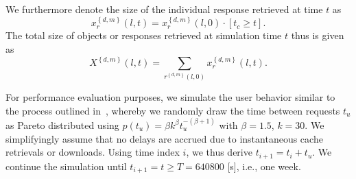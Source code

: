 \documentclass[letterpaper,conference]{IEEEtran}
\begin{document}
We furthermore denote the size of the individual response retrieved at time $t$ as 
\begin{equation}
x_{r}^{\left\{ d,m \right\}}(l,t) = x_{r}^{\left\{ d,m \right\}}(l,0) \cdot \left[ t_c \ge t \right].
\end{equation}
The total size of objects or responses retrieved at simulation time $t$ thus is given as 
\begin{equation}
X^{\left\{ d,m \right\}}(l,t) =\sum_{r^{\left\{ d,m \right\}}(l,0)} x_{r}^{\left\{ d,m \right\}}(l,t).
\end{equation}


For performance evaluation purposes, we simulate the user behavior similar to the process outlined in~\cite{AnCoGrPa03}, whereby we randomly draw the time between requests $t_u$ as Pareto distributed using
$p(t_u)=\beta k^\beta t_u^{-(\beta+1)}$ with $\beta=1.5$, $k=30$.
We simplifyingly assume that no delays are accrued due to instantaneous cache retrievals or downloads. 
Using time index $i$, we thus derive $t_{i+1}=t_i + t_u$.
We continue the simulation until $t_{i+1} = t \ge T =  640800$ [s], i.e., one week.

%
%
%
\end{document}
